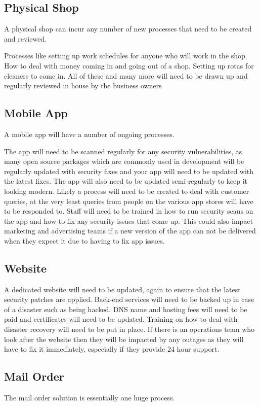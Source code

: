\documentclass{article}
\begin{document}
\subsection{Physical Shop}
A physical shop can incur any number of new processes that need to be created and reviewed. 


Processes like setting up work schedules for anyone who will work in the shop. 
How to deal with money coming in and going out of a shop.
Setting up rotas for cleaners to come in.
All of these and many more will need to be drawn up and regularly reviewed in house by the business owners


\subsection{Mobile App}
A mobile app will have a number of ongoing processes.

The app will need to be scanned regularly for any security vulnerabilities, as many open source packages which are commonly used in development will be regularly updated with security fixes and your app will need to be updated with the latest fixes.
The app will also need to be updated semi-regularly to keep it looking modern.
Likely a process will need to be created to deal with customer queries, at the very least queries from people on the various app stores will have to be responded to.
Staff will need to be trained in how to run security scans on the app and how to fix any security issues that come up.
This could also impact marketing and advertising teams if a new version of the app can not be delivered when they expect it due to having to fix app issues.


\subsection{Website}

A dedicated website will need to be updated, again to ensure that the latest security patches are applied.
Back-end services will need to be backed up in case of a disaster such as being hacked.
DNS name and hosting fees will need to be paid and certificates will need to be updated.
Training on how to deal with disaster recovery will need to be put in place.
If there is an operations team who look after the website then they will be impacted by any outages as they will have to fix it immediately, especially if they provide 24 hour support.


\subsection{Mail Order}
The mail order solution is essentially one huge process.
\end{document}
